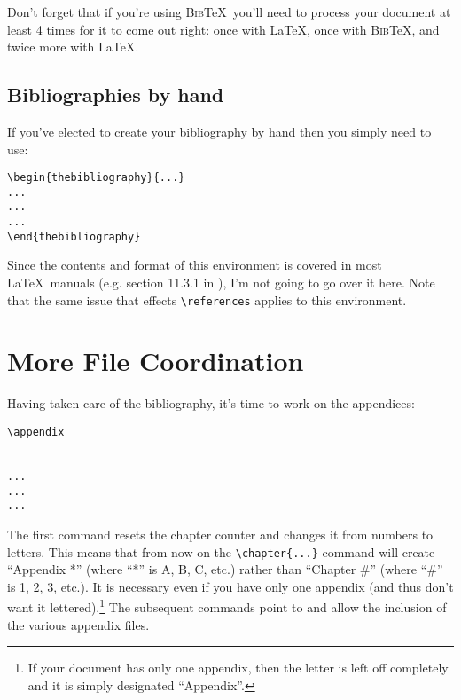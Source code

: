 Don't forget that if you're using \textsc{Bib}\TeX\ you'll need to process your document at least 4 times for it to come out right: once with \LaTeX, once with \textsc{Bib}\TeX, and twice more with \LaTeX.

\subsection{Bibliographies by hand}
If you've elected to create your bibliography by hand then you simply need to use:
\begin{verbatim}
\begin{thebibliography}{...}
...
...
...
\end{thebibliography}
\end{verbatim}
Since the contents and format of this environment is covered in most \LaTeX\ manuals (e.g. section 11.3.1 in \cite{Kopka:2004}), I'm not going to go over it here.  Note that the same issue that effects \verb=\references= applies to this environment.

\section{More File Coordination}

Having taken care of the bibliography, it's time to work on the appendices:

\begin{verbatim}
\appendix


...
...
...
\end{verbatim}

The first command resets the chapter counter and changes it from numbers to letters.  This means that from now on the \verb=\chapter{...}= command will create ``Appendix *'' (where ``*'' is A, B, C, etc.) rather than ``Chapter \#'' (where ``\#'' is 1, 2, 3, etc.).  It is necessary even if you have only one appendix (and thus don't want it lettered).\footnote{If your document has only one appendix, then the letter is left off completely and it is simply designated ``Appendix''.}  The subsequent commands point to and allow the inclusion of the various appendix files.

